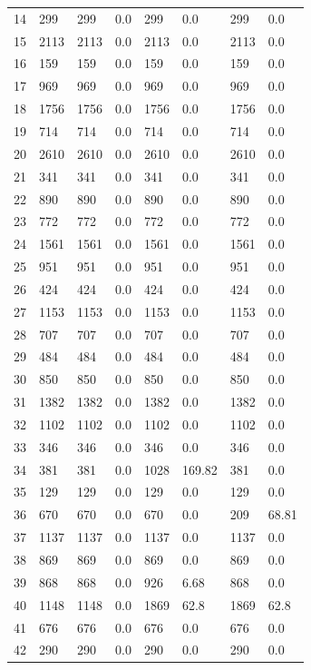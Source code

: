 \begin{longtable}{llllllll}
	14 & 299 & 299 & 0.0 & 299 & 0.0 & 299 & 0.0 \\
	15 & 2113 & 2113 & 0.0 & 2113 & 0.0 & 2113 & 0.0 \\
	16 & 159 & 159 & 0.0 & 159 & 0.0 & 159 & 0.0 \\
	17 & 969 & 969 & 0.0 & 969 & 0.0 & 969 & 0.0 \\
	18 & 1756 & 1756 & 0.0 & 1756 & 0.0 & 1756 & 0.0 \\
	19 & 714 & 714 & 0.0 & 714 & 0.0 & 714 & 0.0 \\
	20 & 2610 & 2610 & 0.0 & 2610 & 0.0 & 2610 & 0.0 \\
	21 & 341 & 341 & 0.0 & 341 & 0.0 & 341 & 0.0 \\
	22 & 890 & 890 & 0.0 & 890 & 0.0 & 890 & 0.0 \\
	23 & 772 & 772 & 0.0 & 772 & 0.0 & 772 & 0.0 \\
	24 & 1561 & 1561 & 0.0 & 1561 & 0.0 & 1561 & 0.0 \\
	25 & 951 & 951 & 0.0 & 951 & 0.0 & 951 & 0.0 \\
	26 & 424 & 424 & 0.0 & 424 & 0.0 & 424 & 0.0 \\
	27 & 1153 & 1153 & 0.0 & 1153 & 0.0 & 1153 & 0.0 \\
	28 & 707 & 707 & 0.0 & 707 & 0.0 & 707 & 0.0 \\
	29 & 484 & 484 & 0.0 & 484 & 0.0 & 484 & 0.0 \\
	30 & 850 & 850 & 0.0 & 850 & 0.0 & 850 & 0.0 \\
	31 & 1382 & 1382 & 0.0 & 1382 & 0.0 & 1382 & 0.0 \\
	32 & 1102 & 1102 & 0.0 & 1102 & 0.0 & 1102 & 0.0 \\
	33 & 346 & 346 & 0.0 & 346 & 0.0 & 346 & 0.0 \\
	34 & 381 & 381 & 0.0 & 1028 & 169.82 & 381 & 0.0 \\
	35 & 129 & 129 & 0.0 & 129 & 0.0 & 129 & 0.0 \\
	36 & 670 & 670 & 0.0 & 670 & 0.0 & 209 & 68.81 \\
	37 & 1137 & 1137 & 0.0 & 1137 & 0.0 & 1137 & 0.0 \\
	38 & 869 & 869 & 0.0 & 869 & 0.0 & 869 & 0.0 \\
	39 & 868 & 868 & 0.0 & 926 & 6.68 & 868 & 0.0 \\
	40 & 1148 & 1148 & 0.0 & 1869 & 62.8 & 1869 & 62.8 \\
	41 & 676 & 676 & 0.0 & 676 & 0.0 & 676 & 0.0 \\
	42 & 290 & 290 & 0.0 & 290 & 0.0 & 290 & 0.0 \\

\end{longtable}
